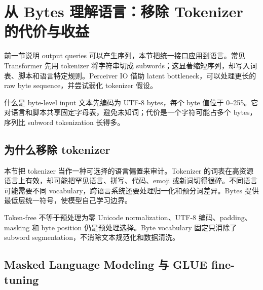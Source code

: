\section{从 Bytes 理解语言：移除 Tokenizer 的代价与收益}

前一节说明 output queries 可以产生序列，本节把统一接口应用到语言。常见 Transformer 先用 tokenizer 将字符串切成 subwords；这显著缩短序列，却写入词表、脚本和语言特定规则。Perceiver IO 借助 latent bottleneck，可以处理更长的 raw byte sequence，并尝试弱化 tokenizer 假设。


\begin{knowledgebox}{什么是 byte-level input}
文本先编码为 UTF-8 bytes，每个 byte 值位于 0--255。它对语言和脚本共享固定字母表，避免未知词；代价是一个字符可能占多个 bytes，序列比 subword tokenization 长得多。
\end{knowledgebox}

\subsection{为什么移除 tokenizer}

本节把 tokenizer 当作一种可选择的语言偏置来审计。Tokenizer 的词表在高资源语言上有效，却可能把罕见语言、拼写、代码、emoji 或新词切得很碎。不同语言可能需要不同 vocabulary，跨语言系统还要处理归一化和预分词差异。Bytes 提供最低层统一符号，使模型自己学习边界。



\begin{warningbox}{Token-free 不等于预处理为零}
Unicode normalization、UTF-8 编码、padding、masking 和 byte position 仍是预处理选择。Byte vocabulary 固定只消除了 subword segmentation，不消除文本规范化和数据清洗。
\end{warningbox}

\subsection{Masked Language Modeling 与 GLUE fine-tuning}

